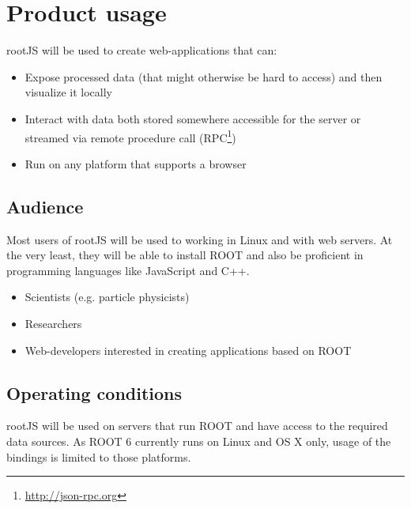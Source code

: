 \chapter{Product usage}

rootJS will be used to create web-applications that can:
\begin{itemize}
	\item Expose processed data (that might otherwise be hard to access) and then visualize it locally
	\item Interact with data both stored somewhere accessible for the server or streamed via remote procedure call (RPC\footnote{\url{http://json-rpc.org}})
	\item Run on any platform that supports a browser
\end{itemize}


\section{Audience}
Most users of rootJS will be used to working in Linux and with web servers. At the very least, they will be able to install ROOT
and also be proficient in programming languages like JavaScript and C++.
\begin{itemize}
	\item Scientists (e.g. particle physicists)
	\item Researchers
	\item Web-developers interested in creating applications based on ROOT
\end{itemize}

\section{Operating conditions}

rootJS will be used on servers that run ROOT and have access to the required data sources. As ROOT 6 currently runs on Linux and OS X only, usage of the bindings is limited to those platforms.
